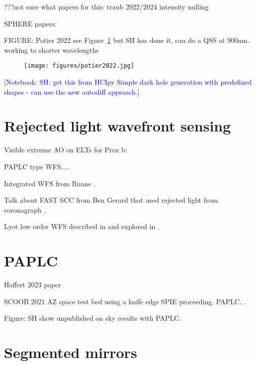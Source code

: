 \documentclass[letterpaper]{ar-1col}
\newcommand{\notebooksuggestion}[1]{\textcolor{blue}{[Notebook: #1]}}
\begin{document}
???not sure what papers for this: traub 2022/2024 intensity nulling

SPHERE papers:


FIGURE: Potier 2022 see Figure~\ref{fig:fpwfsclean} but SH has done it, can do a QSS at 900nm. working to shorter wavelengths

\begin{figure}[ht]
  \centering
  \texttt{[image: figures/potier2022.jpg]}
  \caption{}
  \label{fig:fpwfsclean}
\end{figure}

\notebooksuggestion{SH: get this from HCIpy Simple dark hole generation with predefined shapes - can use the new autodiff approach.}

\lipsum[2-4]

\section{Rejected light wavefront sensing} 

Visible extreme AO on ELTs for Prox b: \citep{Fowler23}

PAPLC type WFS....

Integrated WFS from Ruane \citep{Ruane20}.

Talk about FAST SCC from Ben Gerard that used rejected light from coronagraph \citep{Gerard18}.


Lyot low order WFS described in \citet{Guyon09} and explored in \citet{Singh14,Singh15}.


\lipsum[2-4]

\section{PAPLC}

\citet{Por20} 

Haffert 2023 paper

SCOOB 2021 AZ space test bed \citep{Ashcraft22} using a knife edgs SPIE proceeding. PAPLC. \citep{vanGorkom22}.

Figure: SH show unpublished on sky results with PAPLC.

\lipsum[2-4]

\section{Segmented mirrors}
\lipsum[2-4]
\end{document}
